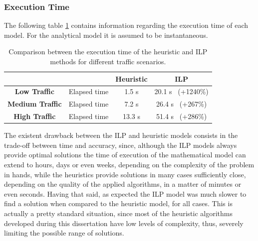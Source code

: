 \subsubsection{Execution Time}

The following table \ref{time} contains information regarding the execution time of each model. For the analytical model it is assumed to be instantaneous.
\vspace{20pt}
\begin{table}[H]
\centering
\begin{tabular}{|c|c|c|c|}
\hline
\multicolumn{2}{|c|}{} & Heuristic & ILP \\ \hline
\textbf{Low Traffic} & Elapsed time & 1.5 s &  20.1 s \ (+1240\%) \\ \hline
\textbf{Medium Traffic} & Elapsed time & 7.2 s & 26.4 s \ (+267\%) \\ \hline
\textbf{High Traffic} & Elapsed time & 13.3 s &  51.4 s \ (+286\%) \\ \hline
\end{tabular}
\caption{Comparison between the execution time of the heuristic and ILP methods for different traffic scenarios.}
\label{time}
\end{table}
\vspace{11pt}
The existent drawback between the ILP and heuristic models consists in the trade-off between time and accuracy, since, although the ILP models always provide optimal solutions the time of execution of the mathematical model can extend to hours, days or even weeks, depending on the complexity of the problem in hands, while the heuristics provide solutions in many cases sufficiently close, depending on the quality of the applied algorithms, in a matter of minutes or even seconds. Having that said, as expected the ILP model was much slower to find a solution when compared to the heuristic model, for all cases. This is actually a pretty standard situation, since most of the heuristic algorithms developed during this dissertation have low levels of complexity, thus, severely limiting the possible range of solutions. 


\clearpage


